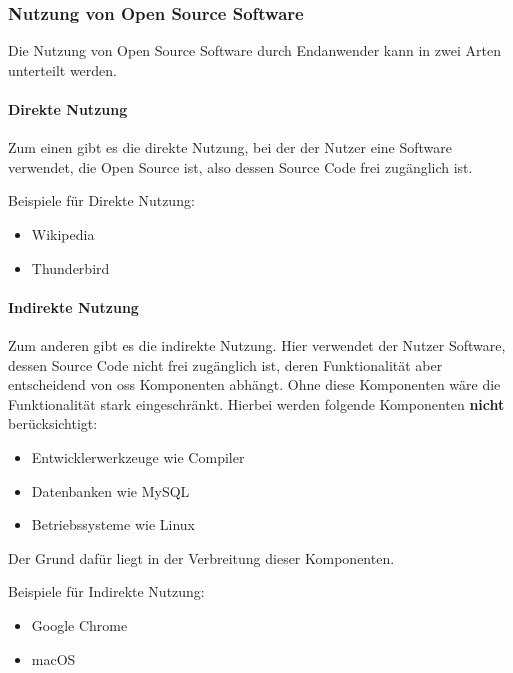 \documentclass[a4paper]{article}
\begin{document}
            \subsubsection{Nutzung von Open Source Software}\label{section:indirekte_nutzung}
                Die Nutzung von Open Source Software durch Endanwender kann in zwei Arten unterteilt werden.
                
                \paragraph{Direkte Nutzung}
                    Zum einen gibt es die direkte Nutzung, bei der der Nutzer eine Software verwendet, die Open Source ist, also dessen Source Code frei zugänglich ist.
                    
                    Beispiele für Direkte Nutzung:
                    \begin{itemize}
                        \item Wikipedia
                        \item Thunderbird %
                    \end{itemize}
                    
                \paragraph{Indirekte Nutzung}
                    Zum anderen gibt es die indirekte Nutzung. Hier verwendet der Nutzer Software, dessen Source Code nicht frei zugänglich ist, deren Funktionalität aber entscheidend von \gls{oss} Komponenten abhängt. Ohne diese Komponenten wäre die Funktionalität stark eingeschränkt. Hierbei werden folgende Komponenten \textbf{nicht} berücksichtigt:
                    
                    \begin{itemize}
                        \item Entwicklerwerkzeuge wie Compiler
                        \item Datenbanken wie MySQL
                        \item Betriebssysteme wie Linux 
                    \end{itemize} %
                    Der Grund dafür liegt in der Verbreitung dieser Komponenten. %
                    
                    Beispiele für Indirekte Nutzung:
                    \begin{itemize}
                        \item Google Chrome %
                        \item macOS %
                    \end{itemize}
\end{document}
